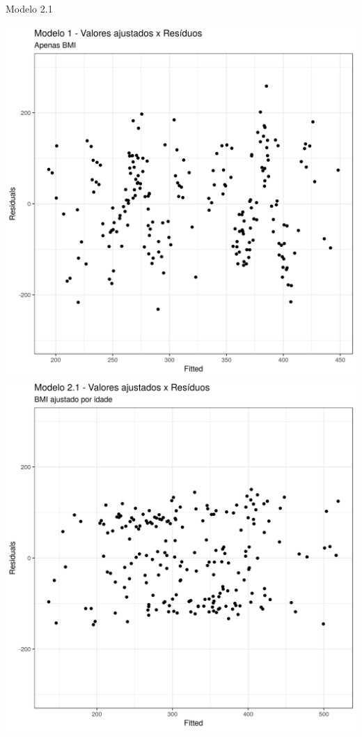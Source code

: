 \documentclass{beamer}
\begin{document}
\begin{frame}{\small Modelo 2.1}
  \begin{center}
    \includegraphics[height=.6\textheight]{Cap31-32/pratica-rlm1-resid}
    \includegraphics[height=.6\textheight]{Cap31-32/pratica-rlm2_1-resid}
  \end{center}
\end{frame}
\end{document}
